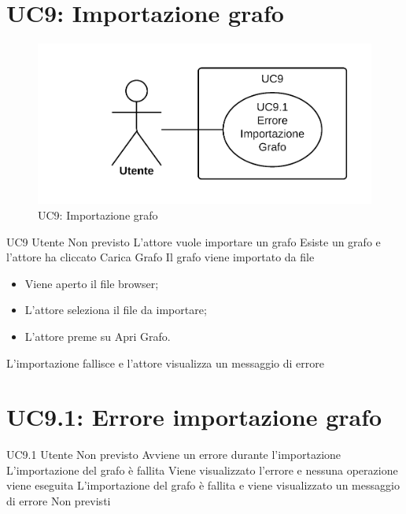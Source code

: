 \documentclass[../AnalisideiRequisiti.tex]{subfiles}
\begin{document}
\section{UC9: Importazione grafo}
\begin{figure}[H]
	\centering
	\includegraphics[width=\textwidth]{../img/UC9.png}
	\caption{UC9: Importazione grafo}
\end{figure}
\UserCase
{UC9}
{Utente}
{Non previsto}
{L'attore vuole importare un grafo}
{Esiste un grafo e l'attore ha cliccato Carica Grafo}
{Il grafo viene importato da file}
{
	\begin{itemize}
			\item{} Viene aperto il file browser;
			\item{} L'attore seleziona il file da importare;
			\item{} L'attore preme su Apri Grafo.
	\end{itemize}
}
{L'importazione fallisce e l'attore visualizza un messaggio di errore }

\section{UC9.1: Errore importazione grafo}
\UserCase
{UC9.1}
{Utente}
{Non previsto}
{Avviene un errore durante l'importazione}
{L'importazione del grafo è fallita}
{Viene visualizzato l'errore e nessuna operazione viene eseguita}
{L'importazione del grafo è fallita e viene visualizzato un messaggio di errore}
{Non previsti}
\end{document}
